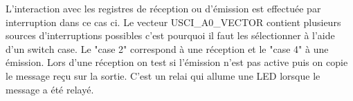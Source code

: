 L'interaction avec les registres de réception ou d'émission est effectuée par interruption dans ce cas ci. Le vecteur USCI\_A0\_VECTOR contient plusieurs sources d'interruptions possibles c'est pourquoi il faut les sélectionner à l'aide d'un switch case. Le "case 2" correspond à une réception et le "case 4" à une émission. Lors d'une réception on test si l'émission n'est pas active puis on copie le message reçu sur la sortie. C'est un relai qui allume une LED lorsque le message a été relayé.